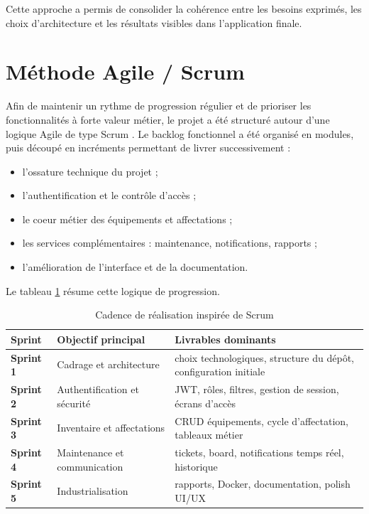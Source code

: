 ﻿\documentclass[12pt,a4paper,oneside]{report}
\begin{document}
Cette approche a permis de consolider la cohérence entre les besoins exprimés, les choix d'architecture et les résultats visibles dans l'application finale.

\section{Méthode Agile / Scrum}
Afin de maintenir un rythme de progression régulier et de prioriser les fonctionnalités à forte valeur métier, le projet a été structuré autour d'une logique Agile de type Scrum \cite{schwaber2020}. Le backlog fonctionnel a été organisé en modules, puis découpé en incréments permettant de livrer successivement :
\begin{itemize}
  \item l'ossature technique du projet ;
  \item l'authentification et le contrôle d'accès ;
  \item le coeur métier des équipements et affectations ;
  \item les services complémentaires : maintenance, notifications, rapports ;
  \item l'amélioration de l'interface et de la documentation.
\end{itemize}

Le tableau \ref{tab:scrum-cadence} résume cette logique de progression.

\begin{table}[H]
\centering
\caption{Cadence de réalisation inspirée de Scrum}
\label{tab:scrum-cadence}
\begin{tabularx}{\textwidth}{>{\bfseries}p{2cm}p{3.8cm}X}
\toprule
Sprint & Objectif principal & Livrables dominants \\
\midrule
Sprint 1 & Cadrage et architecture & choix technologiques, structure du dépôt, configuration initiale \\
Sprint 2 & Authentification et sécurité & JWT, rôles, filtres, gestion de session, écrans d'accès \\
Sprint 3 & Inventaire et affectations & CRUD équipements, cycle d'affectation, tableaux métier \\
Sprint 4 & Maintenance et communication & tickets, board, notifications temps réel, historique \\
Sprint 5 & Industrialisation & rapports, Docker, documentation, polish UI/UX \\
\bottomrule
\end{tabularx}
\end{table}
\end{document}
